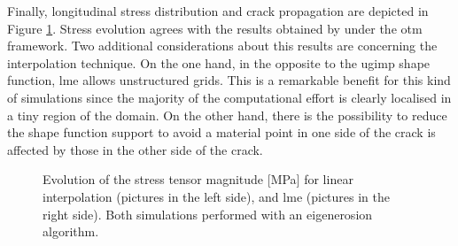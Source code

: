 \documentclass[preprint,12pt,a4paper]{elsarticle}
\begin{document}
Finally, longitudinal stress distribution and crack propagation are
depicted in Figure \ref{fig:Stress-vs-damage-impact-test}. Stress
evolution agrees with the results obtained by \cite{Navas_2017_ES}
under the \acrshort{otm} framework. Two additional considerations about
this results are concerning the interpolation technique. On the one hand,
in the opposite to the \acrshort{ugimp} shape function, \acrshort{lme}
allows unstructured grids. This is a remarkable benefit for this kind
of simulations since the majority of the computational effort is
clearly localised in a tiny region of the domain. On the other
hand, there is the possibility to reduce the shape function support to avoid
a material point in one side of the crack is affected by those in the
other side of the crack.
\begin{figure}
\centering
{}
\caption{Evolution of the stress tensor magnitude [MPa] for linear
  interpolation (pictures in the left side), and \acrshort{lme}
  (pictures in the right side). Both simulations performed with an
  eigenerosion algorithm.}
\label{fig:Stress-vs-damage-impact-test}
\end{figure}
\end{document}
